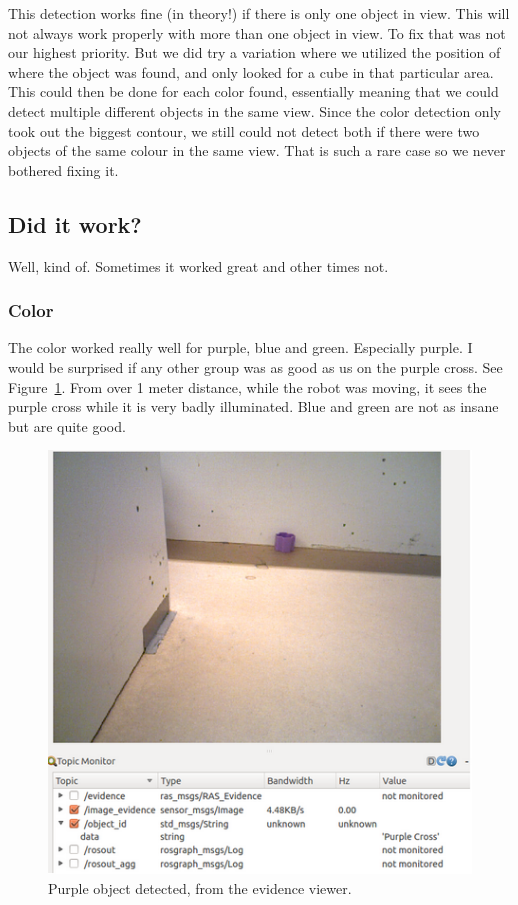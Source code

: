 \documentclass[10pt,a4paper,twocolumn]{article}
\begin{document}
This detection works fine (in theory!) if there is only one object in view. This
will not always work properly with more than one object in view. To fix that was
not our highest priority. But we did try a variation where we utilized the
position of where the object was found, and only looked for a cube in that
particular area. This could then be done for each color found, essentially
meaning that we could detect multiple different objects in the same view. Since
the color detection only took out the biggest contour, we still could not detect
both if there were two objects of the same colour in the same view. That is such
a rare case so we never bothered fixing it.

\subsection{Did it work?}
Well, kind of. Sometimes it worked great and other times not.

\subsubsection{Color}
The color worked really well for purple, blue and green. Especially purple. I
would be surprised if any other group was as good as us on the purple cross. See
Figure~\ref{fig:longpurple}. From over 1 meter distance, while the robot was
moving, it sees the purple cross while it is very badly illuminated. Blue and
green are not as insane but are quite good.
\begin{figure}
  \centering
  \includegraphics[width=\linewidth]{images/longpurple.png}
  \caption{Purple object detected, from the evidence viewer.}
  \label{fig:longpurple}
\end{figure}
\end{document}
